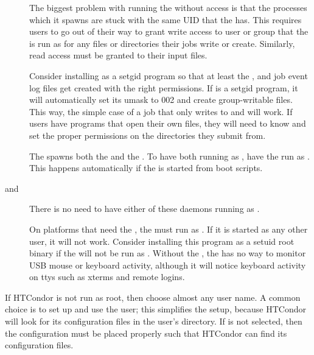 \begin{description}
\item[] The biggest problem with running the 
    without  access is that the  processes which it
    spawns are stuck with the same UID that the  has.
    This requires users to go out of their way
    to grant write access to user or group that the  is run as
    for any files or directories their jobs write or create.
    Similarly, read access must be granted to their input files.

    Consider installing  as a setgid 
    program so that at least the ,  and
    job event log files get created with the right permissions.  If
     is a setgid program, it will automatically set
    its umask to 002 and create group-writable files.  This
    way, the simple case of a job that only writes to 
    and  will work.  If users have programs that open
    their own files, they will need to know and set the proper permissions
    on the directories they submit from.

\item[] The  spawns both the
     and the . To have both running
    as , have the  run as .
    This happens
    automatically if the  is started from boot scripts.

\item[ and ]
    There is no need to have either of these daemons running as .

\item[] On platforms that need the ,
    the  must run as .  If it is
    started as any other user, it will not work.  Consider
    installing this program as a setuid root binary if the  will
    not be run as .
    Without the ,
    the  has no way to monitor USB mouse or keyboard activity,
    although it will notice keyboard activity on ttys such as
    xterms and remote logins.

\end{description}

If HTCondor is not run as root, then choose almost any user name.
A common choice is to set up and use the  user; this
simplifies the setup,
because HTCondor will look for its configuration
files in the  user's directory.
If  is not selected,
then the configuration must be placed properly such that
HTCondor can find its configuration files. 

